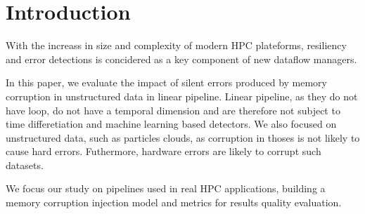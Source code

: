 \documentclass[10pt,a4paper,twoside,twocolumn]{article}
\newcommand*{\rootPath}{../}
\begin{document}
\section{Introduction}

With the increass in size and complexity of modern HPC plateforms, resiliency
and error detections is concidered as a key component of new dataflow managers.

In this paper, we evaluate the impact of silent errors produced by memory
corruption in unstructured data in linear pipeline. Linear pipeline, as they do
not have loop, do not have a temporal dimension and are therefore not subject to
time differetiation and machine learning based detectors. We also focused on
unstructured data, such as particles clouds, as corruption in thoses is not
likely to cause hard errors. Futhermore, hardware errors are likely to corrupt
such datasets.

We focus our study on  pipelines used in real HPC applications,
building a memory corruption injection model and metrics for results quality
evaluation.

\ifstandalone
	
	
\fi
\end{document}
